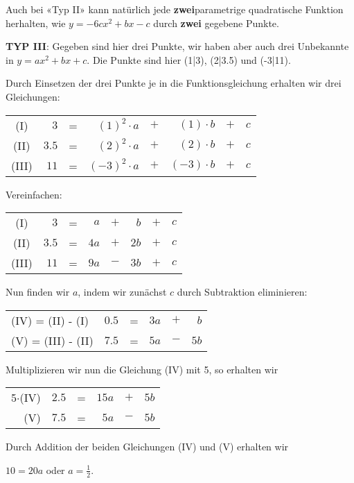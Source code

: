 Auch bei «Typ II» kann natürlich jede \textbf{zwei}parametrige quadratische
Funktion herhalten, wie \zB $y=-6cx^2 + bx - c$ durch \textbf{zwei}
gegebene Punkte.
\newpage


\textbf{TYP III}: Gegeben sind hier drei Punkte, wir haben aber auch
drei Unbekannte in $y = ax^2 + bx + c$. Die Punkte sind hier
(1|3), (2|3.5) und (-3|11).

Durch Einsetzen der drei Punkte je in die Funktionsgleichung erhalten
wir drei Gleichungen:

\begin{tabular}{c|r c rcrcr|}
  (I)   & $3$   & = & $(1)^2\cdot{}a$  &$+$& $(1)\cdot{}b$  &$+$& $c$ \\ 
  (II)  & $3.5$ & = & $(2)^2\cdot{}a$  &$+$& $(2)\cdot{}b$  &$+$& $c$ \\ 
  (III) & $11$  & = & $(-3)^2\cdot{}a$ &$+$& $(-3)\cdot{}b$ &$+$& $c$ \\ 
\end{tabular}

Vereinfachen:

\begin{tabular}{c|r c rcrcr|}
  (I)   & $3$   & = & $a$  &$+$& $b$  &$+$& $c$ \\ 
  (II)  & $3.5$ & = & $4a$ &$+$& $2b$ &$+$& $c$ \\ 
  (III) & $11$  & = & $9a$ &$-$& $3b$ &$+$& $c$ \\ 
\end{tabular}

Nun finden wir $a$, indem wir zunächst $c$ durch Subtraktion
eliminieren:

\begin{tabular}{l|r c rcr|}
  (IV) = (II) -   (I) & $0.5$  & = & $3a$ &$+$& $b$ \\ 
  (V)  = (III) - (II) & $7.5$  & = & $5a$ &$-$& $5b$ \\ 
\end{tabular}

Multiplizieren wir nun die Gleichung (IV) mit 5, so erhalten wir

\begin{tabular}{r|r c rcr|}
  5$\cdot{}$(IV)  & $2.5$  & = & $15a$ &$+$& $5b$ \\ 
  (V)             & $7.5$  & = & $5a$  &$-$& $5b$ \\ 
\end{tabular}

Durch Addition der beiden Gleichungen (IV) und (V) erhalten wir

$10 = 20a$ oder $a = \frac{1}{2}$.

